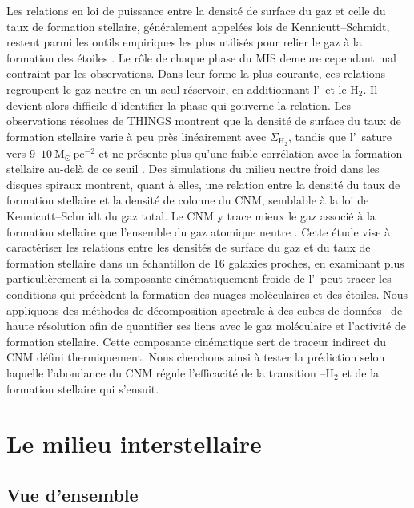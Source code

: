 Les relations en loi de puissance entre la densité de surface du gaz et celle du taux de formation stellaire, généralement appelées lois de Kennicutt--Schmidt, restent parmi les outils empiriques les plus utilisés pour relier le gaz à la formation des étoiles \citep{Schmidt1959, Kennicutt1998}. Le rôle de chaque phase du MIS demeure cependant mal contraint par les observations. Dans leur forme la plus courante, ces relations regroupent le gaz neutre en un seul réservoir, en additionnant l'\HI\ et le H$_2$. Il devient alors difficile d'identifier la phase qui gouverne la relation. Les observations résolues de THINGS montrent que la densité de surface du taux de formation stellaire varie à peu près linéairement avec $\Sigma_{\mathrm{H_2}}$, tandis que l'\HI\ sature vers $9$--$10\ \mathrm{M_\odot\,pc^{-2}}$ et ne présente plus qu'une faible corrélation avec la formation stellaire au-delà de ce seuil \citep{Fbigiel2008}. Des simulations du milieu neutre froid dans les disques spiraux montrent, quant à elles, une relation entre la densité du taux de formation stellaire et la densité de colonne du CNM, semblable à la loi de Kennicutt--Schmidt du gaz total. Le CNM y trace mieux le gaz associé à la formation stellaire que l'ensemble du gaz atomique neutre \citep{Smith2023}. Cette étude vise à caractériser les relations entre les densités de surface du gaz et du taux de formation stellaire dans un échantillon de 16 galaxies proches, en examinant plus particulièrement si la composante cinématiquement froide de l'\HI\ peut tracer les conditions qui précèdent la formation des nuages moléculaires et des étoiles. Nous appliquons des méthodes de décomposition spectrale à des cubes de données \HI\ de haute résolution afin de quantifier ses liens avec le gaz moléculaire et l'activité de formation stellaire. Cette composante cinématique sert de traceur indirect du CNM défini thermiquement. Nous cherchons ainsi à tester la prédiction selon laquelle l'abondance du CNM régule l'efficacité de la transition \HI--H$_2$ et de la formation stellaire qui s'ensuit.

\section{Le milieu interstellaire}
\subsection{Vue d'ensemble}

